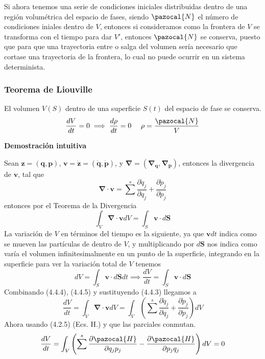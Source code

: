 Si ahora tenemos una serie de condiciones iniciales distribuidas dentro de una región volumétrica del espacio de fases, siendo $\pazocal{N}$ el número de condiciones iniales dentro de $V$, entonces si consideramos como la frontera de $V$ se transforma con el tiempo para dar $V'$, entonces $\pazocal{N}$ se conserva, puesto que para que una trayectoria entre o salga del volumen sería necesario que cortase una trayectoria de la frontera, lo cual no puede ocurrir en un sistema determinista.
\subsubsection{Teorema de Liouville} 
El volumen $V(S)$ dentro de una superficie $S(t)$ del espacio de fase se conserva.
\begin{equation} \label{4.3.2}
    \frac{dV}{dt}=0 \implies \frac{d\rho}{dt} = 0 \ \ \ \ \rho = \frac{\pazocal{N}}{V}
\end{equation} 

\textbf{Demostración intuitiva}

Sean $\mathbf{z}=(\mathbf{q},\mathbf{p})$, $\mathbf{v}=\dot{\mathbf{z}}=(\dot{\mathbf{q}},\dot{\mathbf{p}})$, y $\mathbf{\nabla} = (\mathbf{\nabla}_\textbf{q},\mathbf{\nabla}_\textbf{p})$, entonces la divergencia de $\mathbf{v}$, tal que
\begin{equation} \label{4.3.4}
    \mathbf{\nabla} \cdot \mathbf{v} = \sum^s \frac{\partial \dot{q}_j}{\partial q_j} + \frac{\partial \dot{p}_j}{\partial p_j}
\end{equation} 
entonces por el Teorema de la Divergencia
\begin{equation} \label{4.3.5}
    \int_V{\mathbf{\nabla} \cdot \mathbf{v} dV} = \int_S \mathbf{v} \cdot d\mathbf{S}
\end{equation} 
La variación de $V$ en términos del tiempo es la siguiente, ya que $\mathbf{v}dt$ indica como se mueven las partículas de dentro de $V$, y multiplicando por $d\mathbf{S}$ nos indica como varía el volumen infinitesimalmente en un punto de la superficie, integrando en la superficie para ver la variación total de $V$ tenemos
\begin{equation} \label{4.3.6}
    dV=\int_S \mathbf{v} \cdot d\mathbf{S} dt \implies \frac{dV}{dt} = \int_S \mathbf{v} \cdot d\mathbf{S}
\end{equation} 
Combinando (4.4.4), (4.4.5) y sustituyendo (4.4.3) llegamos a 
\begin{equation} \label{4.3.7}
    \frac{dV}{dt} = \int_V{\mathbf{\nabla} \cdot \mathbf{v} dV} = \int_V{\left(\sum^s \frac{\partial \dot{q}_j}{\partial q_j} + \frac{\partial \dot{p}_j}{\partial p_j}\right)dV}
\end{equation} 
Ahora usando (4.2.5) (Ecs. H.) y que las parciales conmutan.
\begin{equation} \label{4.3.8}
    \frac{dV}{dt} = \int_V{\left(\sum^s \frac{\partial \pazocal{H}}{\partial q_j p_j} - \frac{\partial \pazocal{H}}{\partial p_j q_j}\right)dV} = 0
\end{equation} 
